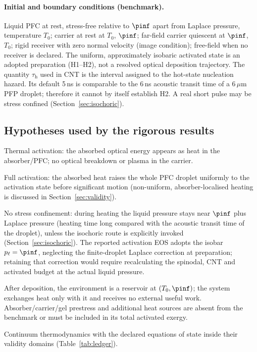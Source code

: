 \paragraph{Initial and boundary conditions (benchmark).} Liquid PFC at rest, stress-free relative to
$\pinf$ apart from Laplace pressure, temperature $T_0$; carrier at rest at $T_0$, $\pinf$; far-field
carrier quiescent at $\pinf$, $T_0$; rigid receiver with zero normal velocity (image condition);
free-field when no receiver is declared. The uniform, approximately isobaric activated state is an
adopted preparation (H1--H2), not a resolved optical deposition trajectory. The quantity
$\tau_{\mathrm h}$ used in CNT is the interval assigned to the hot-state nucleation hazard.
Its default 5\,ns is comparable to the 6\,ns acoustic transit time of a 6\,$\mu$m PFP droplet;
therefore it cannot by itself establish H2. A real short pulse may be stress confined
(Section~\ref{sec:isochoric}).

\subsection{Hypotheses used by the rigorous results}
\begin{description}[leftmargin=1.2cm,style=sameline]
\item[H0] Thermal activation: the absorbed optical energy appears as heat in the absorber/PFC; no
optical breakdown or plasma in the carrier.
\item[H1] Full activation: the absorbed heat raises the whole PFC droplet uniformly to the activation
state before significant motion (non-uniform, absorber-localised heating is discussed in Section~\ref{sec:validity}).
\item[H2] No stress confinement: during heating the liquid pressure stays near $\pinf$ plus Laplace
pressure (heating time long compared with the acoustic transit time of the droplet), unless the
isochoric route is explicitly invoked (Section~\ref{sec:isochoric}).
The reported activation EOS adopts the isobar $p_\ell=\pinf$, neglecting the finite-droplet
Laplace correction at preparation; retaining that correction would require recalculating the
spinodal, CNT and activated budget at the actual liquid pressure.
\item[H3] After deposition, the environment is a reservoir at $(T_0,\pinf)$; the system exchanges
heat only with it and receives no external useful work. Absorber/carrier/gel prestress and additional
heat sources are absent from the benchmark or must be included in its total activated exergy.
\item[H4] Continuum thermodynamics with the declared equations of state inside their validity
domains (Table~\ref{tab:ledger}).
\end{description}

